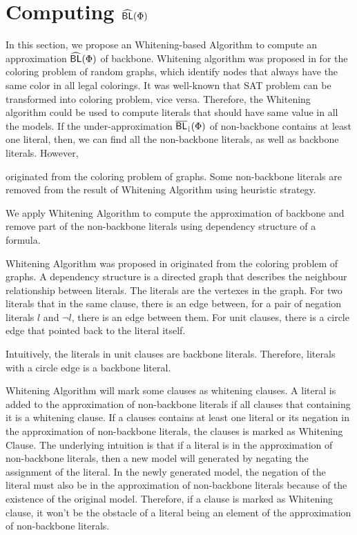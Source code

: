 \section{Computing ${\sf \widehat{BL}}(\Phi)$}
In this section, we propose an Whitening-based Algorithm to compute an approximation ${\sf \widehat{BL}}(\Phi)$ of backbone.
Whitening algorithm was proposed in \cite{Par03} for the coloring problem of random graphs, which identify nodes that always have the same color in all legal colorings. It was well-known that SAT problem can be transformed into coloring problem, vice versa.
Therefore, the Whitening algorithm could be used to compute literals that should have same value in all the models.
If the under-approximation ${\sf \overline{BL}_\downharpoonright}(\Phi)$ of non-backbone contains at least one literal, 
then, we can find all the non-backbone literals, as well as backbone literals.
However, 


 
 originated from the coloring problem of graphs. Some non-backbone literals are removed from the result of Whitening Algorithm using heuristic strategy.


 We apply Whitening Algorithm to compute the approximation of backbone and remove part of the non-backbone literals using dependency structure of a formula.

 Whitening Algorithm was proposed in \cite{CJG2001} originated from the coloring problem of graphs. A dependency structure is a directed graph that describes the neighbour relationship between literals. The literals are the vertexes in the graph. For two literals that in the same clause, there is an edge between, for a pair of negation literals $l$ and $\neg l$, there is an edge between them. For unit clauses, there is a circle edge that pointed back to the literal itself.

 Intuitively, the literals in unit clauses are backbone literals. Therefore, literals with a circle edge is a backbone literal.

 Whitening Algorithm will mark some clauses as whitening clauses. A literal is added to the approximation of non-backbone literals if all clauses that containing it is a whitening clause. If a clauses contains at least one literal or its negation in the approximation of non-backbone literals, the clauses is marked as Whitening Clause. The underlying intuition is that if a literal is in the approximation of non-backbone literals, then a new model will generated by negating the assignment of the literal. In the newly generated model, the negation of the literal must also be in the approximation of non-backbone literals because of the existence of the original model. Therefore, if a clause is marked as Whitening clause, it won't be the obstacle of a literal being an element of the approximation of non-backbone literals.

